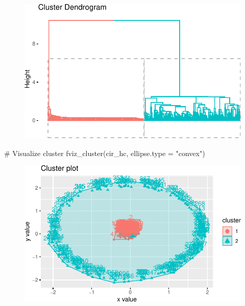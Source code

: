 \documentclass[
  letterpaper,
  DIV=11,
  numbers=noendperiod]{scrreprt}
\newenvironment{Shaded}{\begin{snugshade}}{\end{snugshade}}
\newcommand{\AttributeTok}[1]{\textcolor[rgb]{0.40,0.45,0.13}{#1}}
\newcommand{\CommentTok}[1]{\textcolor[rgb]{0.37,0.37,0.37}{#1}}
\newcommand{\FunctionTok}[1]{\textcolor[rgb]{0.28,0.35,0.67}{#1}}
\newcommand{\NormalTok}[1]{\textcolor[rgb]{0.00,0.23,0.31}{#1}}
\newcommand{\StringTok}[1]{\textcolor[rgb]{0.13,0.47,0.30}{#1}}
\begin{document}
\begin{figure}[H]

{\centering \includegraphics{./12-clustering_files/figure-pdf/unnamed-chunk-8-1.pdf}

}

\end{figure}

\begin{Shaded}
\begin{Highlighting}[]
\CommentTok{\# Visualize cluster}
\FunctionTok{fviz\_cluster}\NormalTok{(cir\_hc, }\AttributeTok{ellipse.type =} \StringTok{"convex"}\NormalTok{)}
\end{Highlighting}
\end{Shaded}

\begin{figure}[H]

{\centering \includegraphics{./12-clustering_files/figure-pdf/unnamed-chunk-8-2.pdf}

}

\end{figure}
\end{document}
